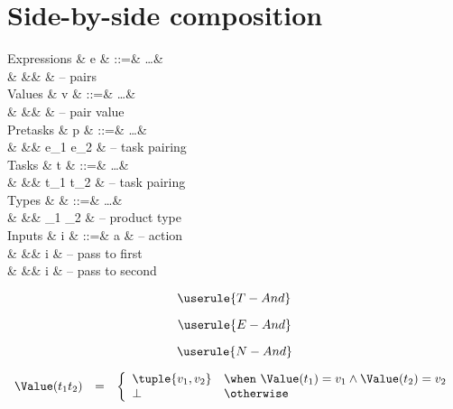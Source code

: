 
\section{Side-by-side composition}

\begin{grammar}
  Expressions
    & e    & ::=& \ldots               & \\
    &      &\mid&      & – pairs \\
  Values
    & v    & ::=& \ldots               & \\
    &      &\mid&      & – pair value \\
  Pretasks
    & p    & ::=& \ldots               & \\
    &      &\mid& e_1 \And e_2         & – task pairing \\
  Tasks
    & t    & ::=& \ldots               & \\
    &      &\mid& t_1 \And t_2         & – task pairing \\
  Types
    & \tau & ::=& \ldots               & \\
    &      &\mid& \tau_1 \times \tau_2 & – product type \\
  Inputs
    & i    & ::=& a                    & – action \\
    &      &\mid& \First i             & – pass to first \\
    &      &\mid& \Second i            & – pass to second \\
\end{grammar}

\begin{equation*}
  \userule{T-And}
\end{equation*}

\begin{equation*}
  \userule{E-And}
\end{equation*}

\begin{equation*}
  \userule{N-And}
\end{equation*}

\begin{equation*}
  \begin{array}{lcl}
    \Value(t_1 \And t_2) &=& \left\{
      \begin{array}{ll}
        \tuple{v_1, v_2} & \when\ \Value(t_1) = v_1 \land \Value(t_2) = v_2 \\
        \bot             & \otherwise
      \end{array}
    \right.
  \end{array}
\end{equation*}

